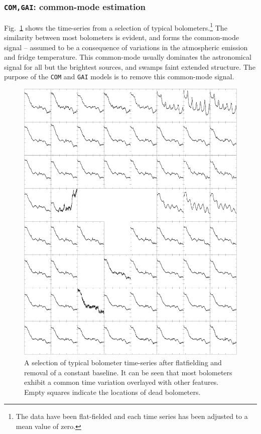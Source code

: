 \documentclass[useAMS,usenatbib,nofootinbib]{mn2e}
\newcommand{\model}[1]{\texttt{#1}}
\begin{document}
\subsubsection{\model{COM,GAI}: common-mode estimation}
\label{sec:comgai}

﻿Fig.~\ref{fig:com} shows the time-series from a selection of typical
bolometers.\footnote{The data have been flat-fielded and each time
series has been adjusted to a mean value of zero.} The similarity
between most bolometers is evident, and forms the common-mode signal
-- assumed to be a consequence of variations in the atmospheric
emission and fridge temperature. This common-mode usually dominates
the astronomical signal for all but the brightest sources, and swamps
faint extended structure.  The purpose of the \model{COM} and
\model{GAI} models is to remove this common-mode signal.

\begin{figure}
\centering
\includegraphics[width=\linewidth]{com.pdf}
\caption{A selection of typical bolometer time-series after
flatfielding and removal of a constant baseline. It can be seen that
most bolometers exhibit a common time variation overlayed with other
features. Empty squares indicate the locations of dead bolometers.}
\label{fig:com}
\end{figure}
\end{document}
